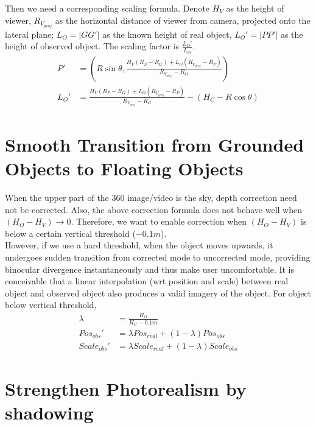 \documentclass[12pt]{article}
\begin{document}
Then we need a corresponding scaling formula. Denote $H_V$ as the height of viewer, $R_{V_{proj}}$ as the horizontal distance of viewer from camera, projected onto the lateral plane; $L_O = |GG'|$ as the known height of real object, $L_O' = |PP'|$ as the height of observed object. The scaling factor is $\frac{L_O'}{L_O}$. 
\begin{align*}
	P' &= (R \sin{\theta}, \frac{H_V (R_P - R_G) + L_O (R_{V_{proj}} - R_P)}{R_{V_{proj}} - R_G}) \\
	L_O' &= \frac{H_V (R_P - R_G) + L_O (R_{V_{proj}} - R_P)}{R_{V_{proj}} - R_G} - (H_C - R \cos{\theta})
\end{align*}

\section{Smooth Transition from Grounded Objects to Floating Objects}

When the upper part of the 360 image/video is the sky, depth correction need not be corrected. Also, the above correction formula does not behave well when $(H_O - H_V) \rightarrow 0$. Therefore, we want to enable correction when $(H_O - H_V)$ is below a certain vertical threshold ($-0.1m$). \\

However, if we use a hard threshold, when the object moves upwards, it undergoes sudden transition from corrected mode to uncorrected mode, providing binocular divergence instantaneously and thus make user uncomfortable. It is conceivable that a linear interpolation (wrt position and scale) between real object and observed object also produces a valid imagery of the object. For object below vertical threshold, 
\begin{align*}
	\lambda &= \frac{H_O}{H_C - 0.1m} \\
	Pos_{obs}' &= \lambda Pos_{real} + (1 - \lambda) Pos_{obs} \\
	Scale_{obs}' &= \lambda Scale_{real} + (1 - \lambda) Scale_{obs}
\end{align*}

\section{Strengthen Photorealism by shadowing}
\end{document}
